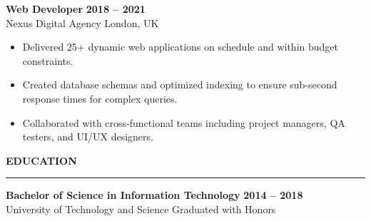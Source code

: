 \documentclass[11pt,a4paper]{article}
\begin{document}
\vspace{6pt}
\noindent\textbf{Web Developer} \hfill \textbf{2018 -- 2021}\\
Nexus Digital Agency \hfill London, UK
\begin{itemize}
    \item Delivered 25+ dynamic web applications on schedule and within budget constraints.
    \item Created database schemas and optimized indexing to ensure sub-second response times for complex queries.
    \item Collaborated with cross-functional teams including project managers, QA testers, and UI/UX designers.
\end{itemize}

\vspace{8pt}
\noindent\textbf{\large EDUCATION}
\vspace{2pt}\hrule\vspace{4pt}
\noindent\textbf{Bachelor of Science in Information Technology} \hfill \textbf{2014 -- 2018}\\
University of Technology and Science \hfill Graduated with Honors
\end{document}
